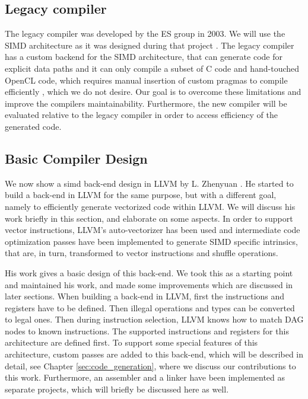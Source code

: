 \subsection{Legacy compiler}
The legacy compiler was developed by the ES group in 2003. We will use the SIMD architecture as it was designed during that project \cite{simd}. The legacy compiler has a custom backend for the SIMD architecture, that can generate code for explicit data paths \cite{dongrio1} and it can only compile a subset of C code and hand-touched OpenCL code, which requires manual insertion of custom pragmas to compile efficiently \cite{dongrio2}, which we do not desire. Our goal is to overcome these limitations and improve the compilers maintainability. Furthermore, the new compiler will be evaluated relative to the legacy compiler in order to access efficiency of the generated code.

\subsection{Basic Compiler Design}\label{sec:basic_compiler_design}
We now show a simd back-end design in LLVM by L. Zhenyuan \cite{liu_zhenyuan}. He started to build a back-end in LLVM for the same purpose, but with a different goal, namely to efficiently generate vectorized code within LLVM. We will discuss his work briefly in this section, and elaborate on some aspects. In order to support vector instructions, LLVM's auto-vectorizer has been used and intermediate code optimization passes have been implemented to generate SIMD specific intrinsics, that are, in turn, transformed to vector instructions and shuffle operations. 

His work gives a basic design of this back-end. We took this as a starting point and maintained his work, and made some improvements which are discussed in later sections. When building a back-end in LLVM, first the instructions and registers have to be defined. Then illegal operations and types can be converted to legal ones. Then during instruction selection, LLVM knows how to match DAG nodes to known instructions. The supported instructions and registers for this architecture are defined first. To support some special features of this architecture, custom passes are added to this back-end, which will be described in detail, see Chapter \ref{sec:code_generation}, where we discuss our contributions to this work. Furthermore, an assembler and a linker have been implemented as separate projects, which will briefly be discussed here as well.

